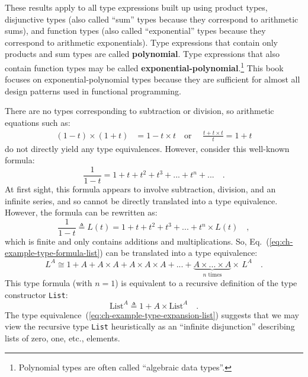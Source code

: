 These results apply to all type expressions built up using product
types, disjunctive types (also called \textsf{``}sum\textsf{''} types because they
correspond to arithmetic sums), and function types (also called \textsf{``}exponential\textsf{''}
types because they correspond to arithmetic exponentials). Type expressions
that contain only products and sum types are called \textbf{polynomial}.
Type expressions that also contain function types may be called \textbf{exponential-polynomial}.\footnote{Polynomial types are often called \textsf{``}algebraic data types\textsf{''}.}
This book focuses on exponential-polynomial types because they are
sufficient for almost all design patterns used in functional programming.

There are no types corresponding to subtraction or division, so arithmetic
equations such as:
\begin{align*}
\left(1-t\right)\times\left(1+t\right) & =1-t\times t\quad\text{or }\quad\frac{t+t\times t}{t}=1+t
\end{align*}
do not directly yield any type equivalences. However, consider this
well-known formula:
\[
\frac{1}{1-t}=1+t+t^{2}+t^{3}+...+t^{n}+...\quad.
\]
At first sight, this formula appears to involve subtraction, division,
and an infinite series, and so cannot be directly translated into
a type equivalence. However, the formula can be rewritten as:
\begin{equation}
\frac{1}{1-t}\triangleq L(t)=1+t+t^{2}+t^{3}+...+t^{n}\times L(t)\quad,\label{eq:ch-example-type-formula-list}
\end{equation}
which is finite and only contains additions and multiplications. So,
Eq.~(\ref{eq:ch-example-type-formula-list}) can be translated into
a type equivalence:
\begin{equation}
L^{A}\cong1+A+A\times A+A\times A\times A+...+\underbrace{A\times...\times A}_{n\text{ times}}\times\,L^{A}\quad.\label{eq:ch-example-type-expansion-list}
\end{equation}
This type formula (with $n=1$) is equivalent to a recursive definition
of the type constructor \lstinline!List!:
\[
\text{List}^{A}\triangleq1+A\times\text{List}^{A}\quad.
\]
The type equivalence~(\ref{eq:ch-example-type-expansion-list}) suggests
that we may view the recursive type \lstinline!List! heuristically
as an \textsf{``}infinite disjunction\textsf{''} describing lists of zero, one, etc.,
elements.

